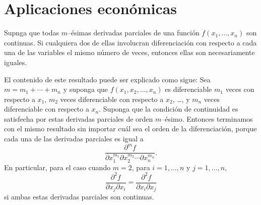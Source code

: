 \section{Aplicaciones económicas}

\begin{frame}[t]

\begin{theorem}
Supnga que todas $m$--ésimas derivadas parciales de una función $f\left(x_{1},\ldots,x_{n}\right)$ son continuas. Si cualquiera dos de ellas involucran diferenciación con respecto a cada una de las variables el mismo número de veces, entonces ellas son necesariamente iguales.
\end{theorem}

El contenido de este resultado puede ser explicado como sigue: Sea $m=m_{1}+\cdots+m_{n}$ y suponga que $f\left(x_{1},x_{2},\ldots,x_{n}\right)$ es diferenciable $m_{1}$ veces con respecto a $x_{1}$, $m_{2}$ veces diferenciable con respecto a $x_{2}$, \ldots, y $m_{n}$ veces diferenciable con respecto a $x_{n}$. Suponga que la condición de continuidad es satisfecha por estas derivadas parciales de orden $m$--ésimo. Entonces terminamos con el mismo resultado sin importar cuál sea el orden de la diferenciación, porque cada una de las derivadas parciales es igual a \[ \frac{\partial^{m}f}{\partial x^{m_{1}}_{1}\partial x^{m_{2}}_{2}\cdots\partial x^{m_{n}}_{n}}. \] En particular, para el caso cuando $m=2$, para $i=1,\ldots,n$ y $j=1,\ldots,n$, \[ \frac{\partial^{2}f}{\partial x_{j}\partial x_{i}}=\frac{\partial^{2}f}{\partial x_{i}\partial x_{j}} \] si ambas estas derivadas parciales son continuas.
\end{frame}

